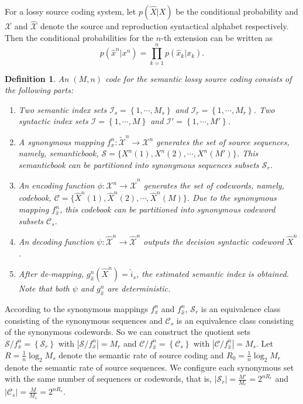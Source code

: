 \documentclass[12pt, draftclsnofoot,onecolumn]{IEEEtran}
\newtheorem{definition}{\bf{Definition}}
\begin{document}
For a lossy source coding system, let $p(\hat{X}|X)$ be the conditional probability and $\mathcal{X}$ and $\hat{\mathcal{X}}$ denote the source and reproduction syntactical alphabet respectively. Then the conditional probabilities for the $n$-th extension can be written as
\begin{equation}
p(\hat{x}^n\left|x^n\right.)=\prod_{k=1}^{n}p(\hat{x}_k\left|x_k\right.).
\end{equation}

\begin{definition}
An $\left(M,n\right)$ code for the semantic lossy source coding consists of the following parts:
\begin{enumerate}[(1)]
   \item Two semantic index sets $\mathcal{I}_s=\left\{1,\cdots, M_s\right\}$ and $\mathcal{I}_r=\left\{1,\cdots, M_r\right\}$. Two syntactic index sets $\mathcal{I}=\left\{1,\cdots, M\right\}$ and $\mathcal{I}'=\left\{1,\cdots, M'\right\}$.
   \item A synonymous mapping $f_{x}^n: {\tilde{\mathcal{X}}}^n\to {\mathcal{X}}^n$ generates the set of source sequences, namely, semanticbook, $\mathcal{S}=\{X^n(1),X^n(2),\cdots,X^n(M')\}$. This semanticbook can be partitioned into synonymous sequences subsets $\mathcal{S}_r$.
   \item An encoding function $\phi: {\mathcal{X}}^n\to  \hat{\mathcal{X}}^n$ generates the set of codewords, namely, codebook, $\mathcal{C}=\{\hat{X}^n(1),\hat{X}^n(2),\cdots,\hat{X}^n(M)\}$. Due to the synonymous mapping $f_{\hat{x}}^n$, this codebook can be partitioned into synonymous codeword subsets $\mathcal{C}_s$.
   \item An decoding function $\psi: \hat{\mathcal{X}}^n \to \hat{\mathcal{X}}^n$ outputs the decision syntactic codeword $\hat{X}^n$.
   \item After de-mapping, $g_{\hat{x}}^n(\hat{X}^n)=\hat{i}_s$, the estimated semantic index is obtained. Note that both $\psi$ and $g_{\hat{x}}^n$ are deterministic.
\end{enumerate}
\end{definition}

According to the synonymous mappings $f_{x}^n$ and $f_{\hat{x}}^n$, $\mathcal{S}_r$ is an equivalence class consisting of the synonymous sequences and $\mathcal{C}_s$ is an equivalence class consisting of the synonymous codewords. So we can construct the quotient sets $\mathcal{S}/f_{x}^n=\left\{\mathcal{S}_r\right\}$ with $\left|\mathcal{S}/f_{x}^n\right|=M_r$ and $\mathcal{C}/f_{\hat{x}}^n=\left\{\mathcal{C}_s\right\}$ with $\left|\mathcal{C}/f_{\hat{x}}^n\right|=M_s$. Let $R=\frac{1}{n}\log_2 M_s$ denote the semantic rate of source coding and $R_0=\frac{1}{n}\log_2 M_r$ denote the semantic rate of source sequences. We configure each synonymous set with the same number of sequences or codewords, that is, $\left|\mathcal{S}_r\right|=\frac{M'}{M_r}=2^{nR_r}$ and $\left|\mathcal{C}_s\right|=\frac{M}{M_s}=2^{nR_s}$.
\end{document}
